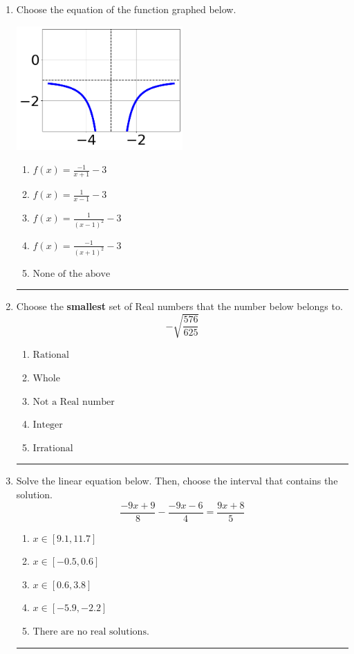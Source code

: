 \documentclass[14pt]{extbook}
\newcommand{\litem}[1]{\item#1\hspace*{-1cm}\rule{\textwidth}{0.4pt}}
\begin{document}
\begin{enumerate}
{\begin{enumerate}[label=\Alph*.]
\end{enumerate} }
\litem{
Choose the equation of the function graphed below.
\begin{center}
    \includegraphics[width=0.5\textwidth]{../Figures/rationalGraphToEquationA.png}
\end{center}
\begin{enumerate}[label=\Alph*.]
\item \( f(x) = \frac{-1}{x + 1} - 3 \)
\item \( f(x) = \frac{1}{x - 1} - 3 \)
\item \( f(x) = \frac{1}{(x - 1)^2} - 3 \)
\item \( f(x) = \frac{-1}{(x + 1)^2} - 3 \)
\item \( \text{None of the above} \)

\end{enumerate} }
\litem{
Choose the \textbf{smallest} set of Real numbers that the number below belongs to.\[ -\sqrt{\frac{576}{625}} \]\begin{enumerate}[label=\Alph*.]
\item \( \text{Rational} \)
\item \( \text{Whole} \)
\item \( \text{Not a Real number} \)
\item \( \text{Integer} \)
\item \( \text{Irrational} \)

\end{enumerate} }
\litem{
Solve the linear equation below. Then, choose the interval that contains the solution.\[ \frac{-9x + 9}{8} - \frac{-9x -6}{4} = \frac{9x + 8}{5} \]\begin{enumerate}[label=\Alph*.]
\item \( x \in [9.1, 11.7] \)
\item \( x \in [-0.5, 0.6] \)
\item \( x \in [0.6, 3.8] \)
\item \( x \in [-5.9, -2.2] \)
\item \( \text{There are no real solutions.} \)


\end{enumerate}}
\end{enumerate}
\end{document}
